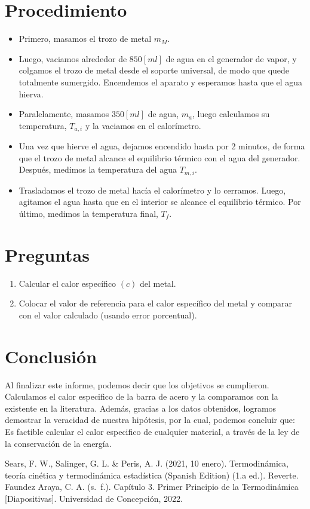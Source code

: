 \documentclass[a4paper, 12p]{article}
\begin{document}
\section{Procedimiento}

\begin{itemize}
      \item Primero, masamos el trozo de metal $m_M$.
      \item Luego, vaciamos alrededor de $850 [ml]$ de agua en el generador de vapor, y colgamos el trozo de metal desde el soporte universal,
      de modo que quede totalmente sumergido. Encendemos el aparato y esperamos hasta que el agua hierva.
      \item Paralelamente, masamos $350 [ml]$ de agua, $m_a$, luego calculamos su temperatura, $T_{a,i}$ y la vaciamos en el calorímetro. 
      \item Una vez que hierve el agua, dejamos encendido hasta por 2 minutos, de forma que el trozo de metal alcance el 
      equilibrio térmico con el agua del generador. Después, medimos la temperatura del agua $T_{m,i}$.
      \item Trasladamos el trozo de metal hacía el calorímetro y lo cerramos. Luego, agitamos el agua hasta que en el interior se 
      alcance el equilibrio térmico. Por último, medimos la temperatura final, $T_f$.
\end{itemize}

\section{Preguntas}
\begin{enumerate}
    \item Calcular el calor específico $(c)$ del metal.
    \item Colocar el valor de referencia para el calor específico del metal y comparar con el valor calculado (usando error porcentual).
\end{enumerate}


\section{Conclusión}
Al finalizar este informe, podemos decir que los objetivos se cumplieron. Calculamos el calor especifico de la barra de acero y la comparamos con la existente en la literatura.
Además, gracias a los datos obtenidos, logramos demostrar la veracidad de nuestra hipótesis, por la cual, podemos concluir que: \\
Es factible calcular el calor especifico de cualquier material, a través de la ley de la conservación de la energía.




\begin{thebibliography}{6}
       Sears, F. W., Salinger, G. L. \& Peris, A. J. (2021, 10 enero). Termodinámica, teoría cinética y termodinámica estadística (Spanish Edition) (1.a ed.). Reverte.
       Faundez Araya, C. A. (s. f.). Capítulo 3. Primer Principio de la Termodinámica [Diapositivas]. Universidad de Concepción, 2022.
\end{thebibliography}
\end{document}
